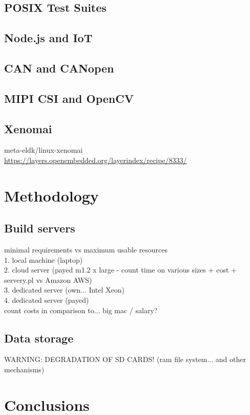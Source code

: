 \documentclass[printmode]{mgr}
\begin{document}
\section{POSIX Test Suites}

\section{Node.js and IoT}

\section{CAN and CANopen}

\section{MIPI CSI and OpenCV}

\section{Xenomai}

meta-eldk/linux-xenomai
\url{https://layers.openembedded.org/layerindex/recipe/8333/}

\chapter{Methodology}
\label{chapter:methodology}

\section{Build servers}
minimal requirements vs maximum usable resources\\
1. local machine (laptop)\\
2. cloud server (payed m1.2 x large - count time on various sizes + cost + servery.pl vs Amazon AWS)\\
3. dedicated server (own... Intel Xeon)\\
4. dedicated server (payed)\\
count costs in comparison to... big mac / salary?

\section{Data storage}
WARNING: DEGRADATION OF SD CARDS! (ram file system... and other mechanisms)

\chapter{Conclusions}
\label{chapter:conclusions}



\listoffigures
\listoftables
\end{document}
